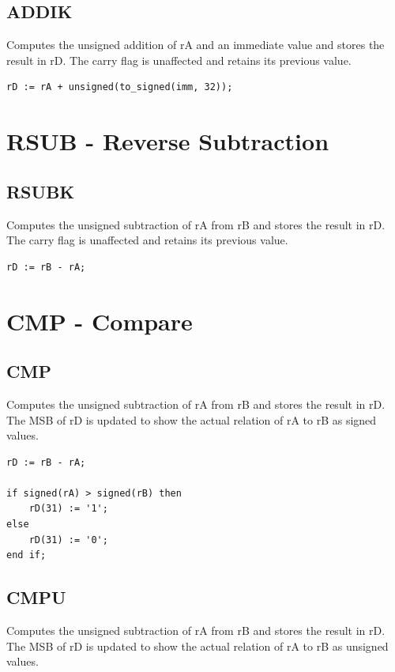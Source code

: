\documentclass{UoYCSproject}
\begin{document}
\subsection{ADDIK}

Computes the unsigned addition of rA and an immediate value and stores the result in rD. The carry flag is unaffected and retains
its previous value.

\begin{lstlisting}
rD := rA + unsigned(to_signed(imm, 32));
\end{lstlisting}

\section{RSUB - Reverse Subtraction}

\subsection{RSUBK}

Computes the unsigned subtraction of rA from rB and stores the result
in rD. The carry flag is unaffected and retains its previous value.

\begin{lstlisting}
rD := rB - rA;
\end{lstlisting}

\section{CMP - Compare}

\subsection{CMP}

Computes the unsigned subtraction of rA from rB and stores the result in rD. The MSB of rD
is updated to show the actual relation of rA to rB as signed values.

\begin{lstlisting}
rD := rB - rA;

if signed(rA) > signed(rB) then
    rD(31) := '1';
else
    rD(31) := '0';
end if;
\end{lstlisting}

\subsection{CMPU}

Computes the unsigned subtraction of rA from rB and stores the result in rD. The MSB of rD
is updated to show the actual relation of rA to rB as unsigned values.
\end{document}
